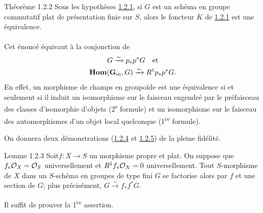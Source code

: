 \documentclass[10pt]{../fichiers-configuration-latex/smfart}
\begin{document}
\begin{enonce*}{Théorème 1.2.2}
Sous les hypothèses \hyperref[XVIII.subsubsec1.2.1]{1.2.1}, si $G$ est un schéma
en groupe commutatif plat de présentation finie sur $S$, alors le
foncteur $K$ de \hyperref[XVIII.subsubsec1.2.1]{1.2.1} est une équivalence.
\end{enonce*}

\setcounter{subsubsection}{2}
\paragraph{}

Cet énoncé équivaut à la conjonction de
\begin{gather*}
G\xrightarrow{\sim} p_{\ast}p^{\ast}G\quad\mbox{\rm et}\\
\operatorname{\mathbf{Hom}}(\mathbf{G}_{m},G)\xrightarrow{\sim} R^{1}p_{\ast}p^{\ast}G{}.
\end{gather*}
En effet, un morphisme de champs en groupoïde est une équivalence si
et seulement si il induit un isomorphisme sur le faisceau engendré par
le préfaisceau des classes d'isomorphie d'objets (2\textsuperscript{e} formule) et un
isomorphisme sur le faisceau des automorphismes d'un objet local
quelconque (1\textsuperscript{re} formule).

On donnera deux démonstrations (\hyperref[XVIII.lem1.2.4]{1.2.4} et
\hyperref[XVIII.subsubsec1.2.5]{1.2.5}) de la pleine fidélité.

\begin{enonce*}{Lemme 1.2.3}
Soit\pageoriginale $f:X\rightarrow S$ un morphisme propre et plat. On
suppose que $f_{\ast}{\mathcal O}_{X}={\mathcal O}_{S}$ universellement et
$R^{1}f_{\ast}{\mathcal O}_{X}=0$ universellement. Tout $S$-morphisme de $X$
dans un $S$-schéma en groupes de type fini $G$ se factorise alors par
$f$ et une section de $G$; plus précisément, $G\xrightarrow{\sim}
f_{\ast}f^{\ast}G$.
\end{enonce*}

Il suffit de prouver la 1\textsuperscript{re} assertion.
\end{document}
